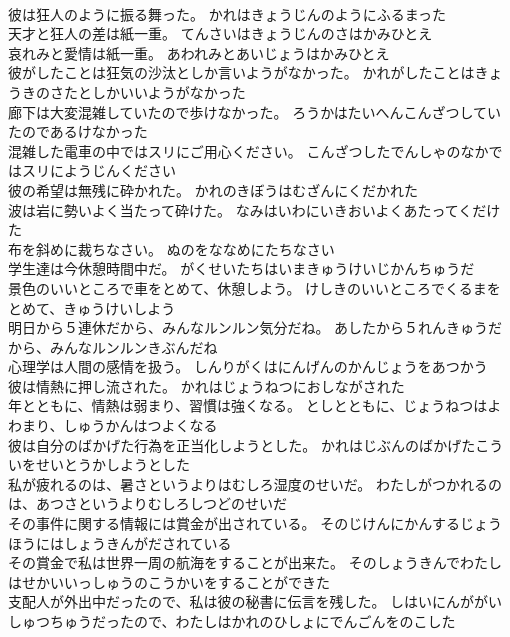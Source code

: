 \documentclass[8pt]{extreport}
\begin{document}
\begin{CJK}{UTF8}{min}
\\	彼は狂人のように振る舞った。	かれはきょうじんのようにふるまった 
\\	天才と狂人の差は紙一重。	てんさいはきょうじんのさはかみひとえ 
\\	哀れみと愛情は紙一重。	あわれみとあいじょうはかみひとえ 
\\	彼がしたことは狂気の沙汰としか言いようがなかった。	かれがしたことはきょうきのさたとしかいいようがなかった 
\\	廊下は大変混雑していたので歩けなかった。	ろうかはたいへんこんざつしていたのであるけなかった 
\\	混雑した電車の中ではスリにご用心ください。	こんざつしたでんしゃのなかではスリにようじんください 
\\	彼の希望は無残に砕かれた。	かれのきぼうはむざんにくだかれた 
\\	波は岩に勢いよく当たって砕けた。	なみはいわにいきおいよくあたってくだけた 
\\	布を斜めに裁ちなさい。	ぬのをななめにたちなさい 
\\	学生達は今休憩時間中だ。	がくせいたちはいまきゅうけいじかんちゅうだ 
\\	景色のいいところで車をとめて、休憩しよう。	けしきのいいところでくるまをとめて、きゅうけいしよう 
\\	明日から５連休だから、みんなルンルン気分だね。	あしたから５れんきゅうだから、みんなルンルンきぶんだね 
\\	心理学は人間の感情を扱う。	しんりがくはにんげんのかんじょうをあつかう 
\\	彼は情熱に押し流された。	かれはじょうねつにおしながされた 
\\	年とともに、情熱は弱まり、習慣は強くなる。	としとともに、じょうねつはよわまり、しゅうかんはつよくなる 
\\	彼は自分のばかげた行為を正当化しようとした。	かれはじぶんのばかげたこういをせいとうかしようとした 
\\	私が疲れるのは、暑さというよりはむしろ湿度のせいだ。	わたしがつかれるのは、あつさというよりむしろしつどのせいだ 
\\	その事件に関する情報には賞金が出されている。	そのじけんにかんするじょうほうにはしょうきんがだされている 
\\	その賞金で私は世界一周の航海をすることが出来た。	そのしょうきんでわたしはせかいいっしゅうのこうかいをすることができた 
\\	支配人が外出中だったので、私は彼の秘書に伝言を残した。	しはいにんががいしゅつちゅうだったので、わたしはかれのひしょにでんごんをのこした 

\end{CJK}
\end{document}
